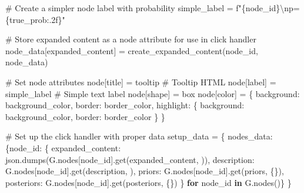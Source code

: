 \documentclass[
  11pt,
  letterpaper,
]{book}
\newenvironment{Shaded}{\begin{snugshade}}{\end{snugshade}}
\newcommand{\CharTok}[1]{\textcolor[rgb]{0.13,0.47,0.30}{#1}}
\newcommand{\CommentTok}[1]{\textcolor[rgb]{0.37,0.37,0.37}{#1}}
\newcommand{\ControlFlowTok}[1]{\textcolor[rgb]{0.00,0.23,0.31}{\textbf{#1}}}
\newcommand{\KeywordTok}[1]{\textcolor[rgb]{0.00,0.23,0.31}{\textbf{#1}}}
\newcommand{\NormalTok}[1]{\textcolor[rgb]{0.00,0.23,0.31}{#1}}
\newcommand{\OperatorTok}[1]{\textcolor[rgb]{0.37,0.37,0.37}{#1}}
\newcommand{\SpecialCharTok}[1]{\textcolor[rgb]{0.37,0.37,0.37}{#1}}
\newcommand{\SpecialStringTok}[1]{\textcolor[rgb]{0.13,0.47,0.30}{#1}}
\newcommand{\StringTok}[1]{\textcolor[rgb]{0.13,0.47,0.30}{#1}}
\begin{document}
\begin{landscape}
\begin{Shaded}
\begin{Highlighting}[]
        \CommentTok{\# Create a simpler node label with probability}
\NormalTok{        simple\_label }\OperatorTok{=} \SpecialStringTok{f"}\SpecialCharTok{\{}\NormalTok{node\_id}\SpecialCharTok{\}}\CharTok{\textbackslash{}n}\SpecialStringTok{p=}\SpecialCharTok{\{}\NormalTok{true\_prob}\SpecialCharTok{:.2f\}}\SpecialStringTok{"}

        \CommentTok{\# Store expanded content as a node attribute for use in click handler}
\NormalTok{        node\_data[}\StringTok{\textquotesingle{}expanded\_content\textquotesingle{}}\NormalTok{] }\OperatorTok{=}\NormalTok{ create\_expanded\_content(node\_id, node\_data)}

        \CommentTok{\# Set node attributes}
\NormalTok{        node[}\StringTok{\textquotesingle{}title\textquotesingle{}}\NormalTok{] }\OperatorTok{=}\NormalTok{ tooltip  }\CommentTok{\# Tooltip HTML}
\NormalTok{        node[}\StringTok{\textquotesingle{}label\textquotesingle{}}\NormalTok{] }\OperatorTok{=}\NormalTok{ simple\_label  }\CommentTok{\# Simple text label}
\NormalTok{        node[}\StringTok{\textquotesingle{}shape\textquotesingle{}}\NormalTok{] }\OperatorTok{=} \StringTok{\textquotesingle{}box\textquotesingle{}}
\NormalTok{        node[}\StringTok{\textquotesingle{}color\textquotesingle{}}\NormalTok{] }\OperatorTok{=}\NormalTok{ \{}
            \StringTok{\textquotesingle{}background\textquotesingle{}}\NormalTok{: background\_color,}
            \StringTok{\textquotesingle{}border\textquotesingle{}}\NormalTok{: border\_color,}
            \StringTok{\textquotesingle{}highlight\textquotesingle{}}\NormalTok{: \{}
                \StringTok{\textquotesingle{}background\textquotesingle{}}\NormalTok{: background\_color,}
                \StringTok{\textquotesingle{}border\textquotesingle{}}\NormalTok{: border\_color}
\NormalTok{            \}}
\NormalTok{        \}}

    \CommentTok{\# Set up the click handler with proper data}
\NormalTok{    setup\_data }\OperatorTok{=}\NormalTok{ \{}
        \StringTok{\textquotesingle{}nodes\_data\textquotesingle{}}\NormalTok{: \{node\_id: \{}
            \StringTok{\textquotesingle{}expanded\_content\textquotesingle{}}\NormalTok{: json.dumps(G.nodes[node\_id].get(}\StringTok{\textquotesingle{}expanded\_content\textquotesingle{}}\NormalTok{, }\StringTok{\textquotesingle{}\textquotesingle{}}\NormalTok{)),}
            \StringTok{\textquotesingle{}description\textquotesingle{}}\NormalTok{: G.nodes[node\_id].get(}\StringTok{\textquotesingle{}description\textquotesingle{}}\NormalTok{, }\StringTok{\textquotesingle{}\textquotesingle{}}\NormalTok{),}
            \StringTok{\textquotesingle{}priors\textquotesingle{}}\NormalTok{: G.nodes[node\_id].get(}\StringTok{\textquotesingle{}priors\textquotesingle{}}\NormalTok{, \{\}),}
            \StringTok{\textquotesingle{}posteriors\textquotesingle{}}\NormalTok{: G.nodes[node\_id].get(}\StringTok{\textquotesingle{}posteriors\textquotesingle{}}\NormalTok{, \{\})}
\NormalTok{        \} }\ControlFlowTok{for}\NormalTok{ node\_id }\KeywordTok{in}\NormalTok{ G.nodes()\}}
\NormalTok{    \}}


\end{Highlighting}
\end{Shaded}
\end{landscape}
\end{document}
